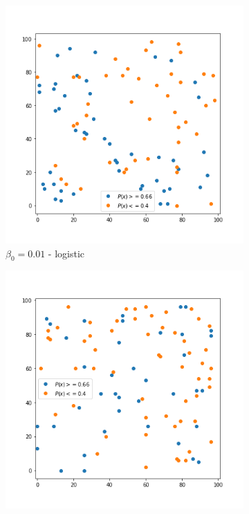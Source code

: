 \begin{figure}[!hb]
\begin{subfigure}{.3\textwidth}
    \label{fig:22}
	\end{subfigure}%
		\begin{subfigure}{.3\textwidth}
	    \centering
	    \includegraphics[width=1\linewidth]{Bilder/simulation_3_3}
	    \caption{$\beta_0=0.01$ - logistic}
	    \label{fig:23}
    \end{subfigure}%
	\begin{subfigure}{.3\textwidth}
    	\centering
    	\includegraphics[width=1\linewidth]{Bilder/simulation_4_3}

\end{subfigure}
\end{figure}
